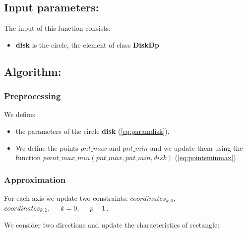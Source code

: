 \documentclass{report}
\begin{document}
\subsection*{Input parameters:}

The input of this function consists:

\begin{itemize}	
	\item {\bfseries disk}  is the circle, the element of class {\bfseries DiskDp} 
\end{itemize}

\subsection*{Algorithm:}

\subsubsection*{Preprocessing}

We define:

\begin{itemize}
	\item the parameters of the circle {\bfseries disk} (\ref{eq:paramdisk}),
	
	
	\item We define the points $pnt\_max$ and $pnt\_min$  and we update them using the function $point\_max\_min(pnt\_max, pnt\_min, disk)$ (\ref{eq:pointsminmax})	
\end{itemize}
 
\subsubsection*{Approximation}

For each axis we update two constraints: $coordinates_{k,0}$, $ coordinates_{k,1}, \hspace*{5mm} k = 0,\hspace*{5mm} p-1 $.

We consider two directions and update the characteristics of rectangle:
\end{document}
